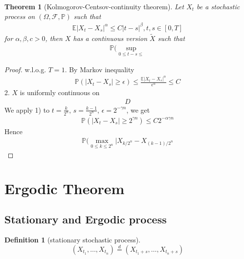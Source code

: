 \documentclass[a4paper,11pt]{book}
\newtheorem{theorem}{Theorem}[section]
\theoremstyle{definition}
\newtheorem{definition}{Definition}[section]
\theoremstyle{remark}
\begin{document}
\begin{theorem}[Kolmogorov-Centsov-continuity theorem]
	Let $X_t$ be a stochastic process on $(\Omega, \mathcal{F}, \mathbb{P})$ such that 
	\begin{align*}
		\mathbb{E}|X_t - X_s|^\alpha \le C |t - s|^\beta, t, s \in [0, T]
	\end{align*}
	for $\alpha, \beta, c >0$, then $X$ has a continuous version $\tilde{X}$ such that
	\begin{align*}
		\mathbb{P}(\sup_{0 \le t- s \le} 
	\end{align*}
\end{theorem}
\begin{proof}
	w.l.o.g. $T = 1$. By Markov inequality
	\begin{align*}
		\mathbb{P}(|X_t - X_s| \geq \epsilon ) \le \frac{\mathbb{E}|X_t - X_s|^\alpha}{\epsilon^\alpha} \le C 
	\end{align*}
	2. $X$ is uniformly continuous on 
	\begin{align*}
		D
	\end{align*}
	We apply 1) to $t = \frac{k}{2^n}$, $s = \frac{k-1}{2^n}$, $\epsilon = 2^{-\gamma n}$, we get
	\begin{align*}
		\mathbb{P}(|X_t - X_s| \ge 2^{\gamma n}) \le C 2^{- \alpha\gamma n}
	\end{align*}
	Hence 
	\begin{align*}
		\mathbb{P}(\max_{0 \le k \le 2^n} | X_{k \slash 2^n} - X_{(k-1)\slash 2^n}
	\end{align*}
\end{proof}






 
 

 
 
 \newpage
 \section{Ergodic Theorem}
 \subsection{Stationary and Ergodic process}
 \begin{definition}[stationary stochastic process]
 \begin{equation*}
 	(X_{t_1}, \dots, X_{t_n}) \overset{d}{=} (X_{t_1 + s}, \dots, X_{t_n + s})
 \end{equation*}
 \end{definition}
 
\end{document}
